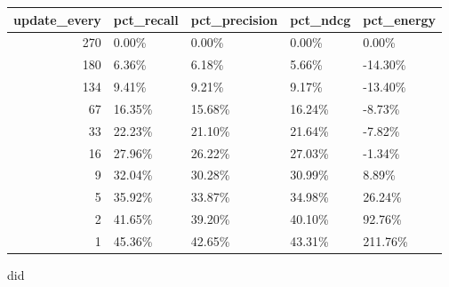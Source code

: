 \begin{tabular}{rllll}
\toprule
update_every & pct_recall & pct_precision & pct_ndcg & pct_energy \\
\midrule
270 & 0.00\% & 0.00\% & 0.00\% & 0.00\% \\
180 & 6.36\% & 6.18\% & 5.66\% & -14.30\% \\
134 & 9.41\% & 9.21\% & 9.17\% & -13.40\% \\
67 & 16.35\% & 15.68\% & 16.24\% & -8.73\% \\
33 & 22.23\% & 21.10\% & 21.64\% & -7.82\% \\
16 & 27.96\% & 26.22\% & 27.03\% & -1.34\% \\
9 & 32.04\% & 30.28\% & 30.99\% & 8.89\% \\
5 & 35.92\% & 33.87\% & 34.98\% & 26.24\% \\
2 & 41.65\% & 39.20\% & 40.10\% & 92.76\% \\
1 & 45.36\% & 42.65\% & 43.31\% & 211.76\% \\
\bottomrule
\end{tabular}
did 
